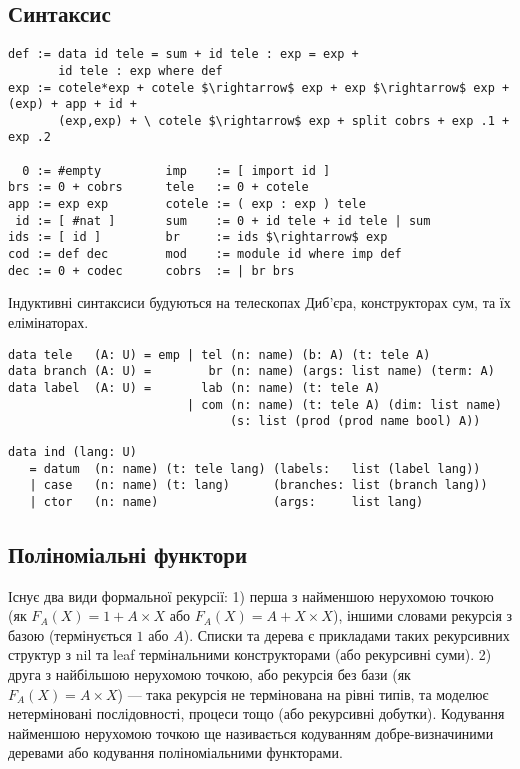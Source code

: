 \subsection{Синтаксис}
\begin{lstlisting}[mathescape=true]
def := data id tele = sum + id tele : exp = exp +
       id tele : exp where def
exp := cotele*exp + cotele $\rightarrow$ exp + exp $\rightarrow$ exp + (exp) + app + id +
       (exp,exp) + \ cotele $\rightarrow$ exp + split cobrs + exp .1 + exp .2

  0 := #empty         imp    := [ import id ]
brs := 0 + cobrs      tele   := 0 + cotele
app := exp exp        cotele := ( exp : exp ) tele
 id := [ #nat ]       sum    := 0 + id tele + id tele | sum
ids := [ id ]         br     := ids $\rightarrow$ exp
cod := def dec        mod    := module id where imp def
dec := 0 + codec      cobrs  := | br brs
\end{lstlisting}

Індуктивні синтаксиси будуються на телескопах Диб'єра,
конструкторах сум, та їх елімінаторах.

\begin{lstlisting}
data tele   (A: U) = emp | tel (n: name) (b: A) (t: tele A)
data branch (A: U) =        br (n: name) (args: list name) (term: A)
data label  (A: U) =       lab (n: name) (t: tele A)
                         | com (n: name) (t: tele A) (dim: list name)
                               (s: list (prod (prod name bool) A))
\end{lstlisting}

\begin{lstlisting}
data ind (lang: U)
   = datum  (n: name) (t: tele lang) (labels:   list (label lang))
   | case   (n: name) (t: lang)      (branches: list (branch lang))
   | ctor   (n: name)                (args:     list lang)
\end{lstlisting}


\subsection{Поліноміальні функтори}
Існує два види формальної рекурсії: 1) перша з найменшою нерухомою точкою
(як $F_A(X) = 1 + A \times X$ або $F_A(X) = A + X \times X$), іншими словами
рекурсія з базою (термінується $1$ або $A$). Списки та дерева є
прикладами таких рекурсивних структур з nil та leaf термінальними
конструкторами (або рекурсивні суми).
2) друга з найбільшою нерухомою точкою, або рекурсія без бази
(як $F_A(X) = A \times X$) --- така рекурсія не термінована на рівні типів,
та моделює нетерміновані послідовності, процеси тощо (або рекурсивні добутки).
Кодування найменшою нерухомою точкою ще називається кодуванням
добре-визначиними деревами або кодування поліноміальними функторами.

